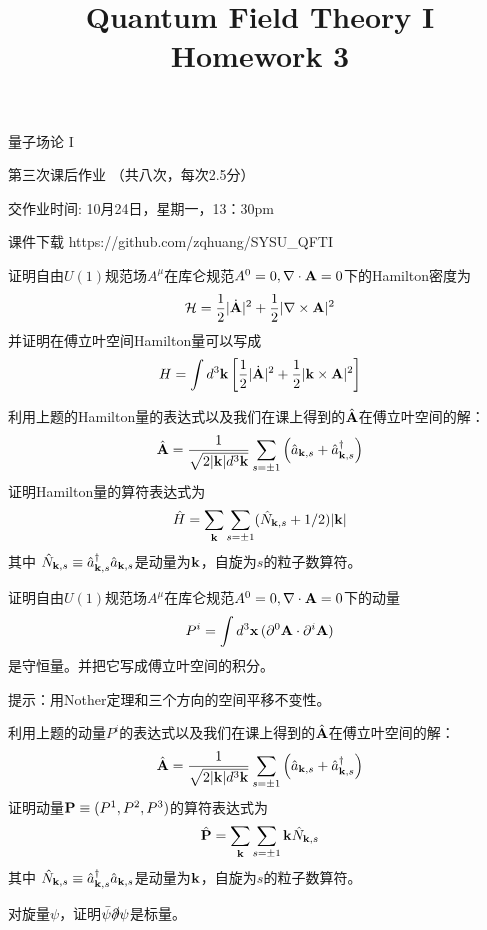 \documentclass[CJK]{beamer}
\title{Quantum Field Theory I \\ Homework 3}
\author{}
\date{}
\begin{document}
\begin{frame}
 
\begin{center}
\begin{Large}
\bch
量子场论 I 

{\vskip 0.3in}

第三次课后作业 （共八次，每次2.5分）

交作业时间: 10月24日，星期一，13：30pm

\ech
\end{Large}
\end{center}

\vskip 0.2in

\bch
课件下载
\ech
https://github.com/zqhuang/SYSU\_QFTI

\end{frame}

\begin{frame}
\bch
证明自由$U(1)$规范场$A^\mu$在库仑规范$A^0=0, \nabla\cdot {\mathbf{A}}=0$下的Hamilton密度为
$${\mathcal{H}} = \frac{1}{2}|\dot{{\mathbf{A}}}|^2 + \frac{1}{2}|\nabla\times {\mathbf{A}}|^2$$
并证明在傅立叶空间Hamilton量可以写成
$$H = \int d^3{\mathbf{k}}\left[\frac{1}{2}|\dot{{\mathbf{A}}}|^2 + \frac{1}{2}|{\mathbf{k}} \times {\mathbf{A}}|^2\right]$$
\ech
\end{frame}

\begin{frame}
\bch
利用上题的Hamilton量的表达式以及我们在课上得到的$\hat{{\mathbf{A}}}$在傅立叶空间的解：
$$\hat{{\mathbf{A}}} = \frac{1}{\sqrt{2|{\mathbf{k}}|d^3{\mathbf{k}}}}\sum_{s=\pm 1} \left({\hat{a}}_{{\mathbf{k}}, s} + {\hat{a}^\dagger}_{{\mathbf{k}}, s}\right)$$
证明Hamilton量的算符表达式为
$$\hat{H} = \sum_{{\mathbf{k}}} \sum_{s=\pm 1}(\hat{N}_{{\mathbf{k}},s}+1/2)|{\mathbf{k}}|$$
其中 $\hat{N}_{{\mathbf{k}}, s} \equiv {\hat{a}^\dagger}_{{\mathbf{k}},s}{\hat{a}}_{{\mathbf{k}}, s}$是动量为${\mathbf{k}}$，自旋为$s$的粒子数算符。
\ech
\end{frame}

\begin{frame}
\bch
证明自由$U(1)$规范场$A^\mu$在库仑规范$A^0=0, \nabla\cdot {\mathbf{A}}=0$下的动量
$$P^i = \int d^3{\mathbf{x}}\, (\partial^0{\mathbf{A}} \cdot \partial^i{\mathbf{A}})$$
是守恒量。并把它写成傅立叶空间的积分。
\skipline
\skipline

提示：用Nother定理和三个方向的空间平移不变性。 
\ech
\end{frame}


\begin{frame}
\bch
利用上题的动量$P^i$的表达式以及我们在课上得到的$\hat{{\mathbf{A}}}$在傅立叶空间的解：
$$\hat{{\mathbf{A}}} = \frac{1}{\sqrt{2|{\mathbf{k}}|d^3{\mathbf{k}}}}\sum_{s=\pm 1} \left({\hat{a}}_{{\mathbf{k}}, s} + {\hat{a}^\dagger}_{{\mathbf{k}}, s}\right)$$
证明动量${\mathbf{P}} \equiv (P^1, P^2, P^3)$的算符表达式为
$$\hat{{\mathbf{P}}} = \sum_{{\mathbf{k}}}\sum_{s = \pm 1} {\mathbf{k}} \hat{N}_{{\mathbf{k}}, s}$$
其中 $\hat{N}_{{\mathbf{k}}, s} \equiv {\hat{a}^\dagger}_{{\mathbf{k}},s}{\hat{a}}_{{\mathbf{k}}, s}$是动量为${\mathbf{k}}$，自旋为$s$的粒子数算符。
\ech
\end{frame}


\begin{frame}
\bch
对旋量$\psi$，证明$\bar\psi\slashed{\partial}\psi$是标量。
\ech
\end{frame}
\end{document}
